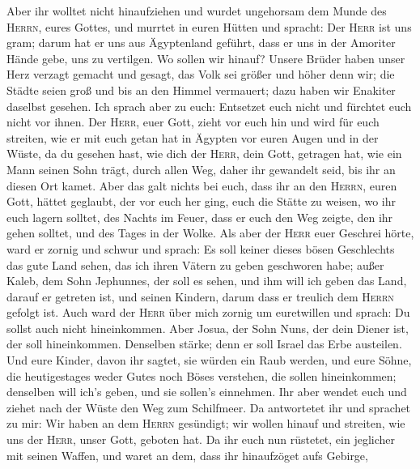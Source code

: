  Aber ihr wolltet nicht hinaufziehen und wurdet
ungehorsam dem Munde des \textsc{Herrn}, eures Gottes, 
und murrtet in euren Hütten und spracht: Der \textsc{Herr} ist uns gram;
darum hat er uns aus Ägyptenland geführt, dass er uns in der Amoriter
Hände gebe, uns zu vertilgen.  Wo sollen wir hinauf?
Unsere Brüder haben unser Herz verzagt gemacht und gesagt, das Volk sei
größer und höher denn wir; die Städte seien groß und bis an den Himmel
vermauert; dazu haben wir Enakiter daselbst gesehen.  Ich
sprach aber zu euch: Entsetzet euch nicht und fürchtet euch nicht vor
ihnen.  Der \textsc{Herr}, euer Gott, zieht vor euch hin
und wird für euch streiten, wie er mit euch getan hat in Ägypten vor
euren Augen  und in der Wüste, da du gesehen hast, wie
dich der \textsc{Herr}, dein Gott, getragen hat, wie ein Mann seinen
Sohn trägt, durch allen Weg, daher ihr gewandelt seid, bis ihr an diesen
Ort kamet.  Aber das galt nichts bei euch, dass ihr an
den \textsc{Herrn}, euren Gott, hättet geglaubt,  der vor
euch her ging, euch die Stätte zu weisen, wo ihr euch lagern solltet,
des Nachts im Feuer, dass er euch den Weg zeigte, den ihr gehen solltet,
und des Tages in der Wolke.  Als aber der \textsc{Herr}
euer Geschrei hörte, ward er zornig und schwur und sprach:
 Es soll keiner dieses bösen Geschlechts das gute Land
sehen, das ich ihren Vätern zu geben geschworen habe; 
außer Kaleb, dem Sohn Jephunnes, der soll es sehen, und ihm will ich
geben das Land, darauf er getreten ist, und seinen Kindern, darum dass
er treulich dem \textsc{Herrn} gefolgt ist.  Auch ward
der \textsc{Herr} über mich zornig um euretwillen und sprach: Du sollst
auch nicht hineinkommen.  Aber Josua, der Sohn Nuns, der
dein Diener ist, der soll hineinkommen. Denselben stärke; denn er soll
Israel das Erbe austeilen.  Und eure Kinder, davon ihr
sagtet, sie würden ein Raub werden, und eure Söhne, die heutigestages
weder Gutes noch Böses verstehen, die sollen hineinkommen; denselben
will ich's geben, und sie sollen's einnehmen.  Ihr aber
wendet euch und ziehet nach der Wüste den Weg zum Schilfmeer.
 Da antwortetet ihr und sprachet zu mir: Wir haben an dem
\textsc{Herrn} gesündigt; wir wollen hinauf und streiten, wie uns der
\textsc{Herr}, unser Gott, geboten hat. Da ihr euch nun rüstetet, ein
jeglicher mit seinen Waffen, und waret an dem, dass ihr hinaufzöget aufs
Gebirge,

